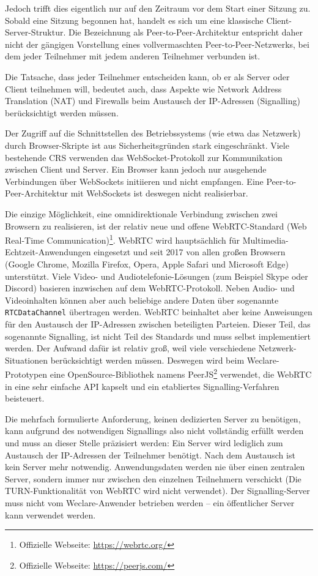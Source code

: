 Jedoch trifft dies eigentlich nur auf den Zeitraum vor dem Start einer Sitzung zu. Sobald eine Sitzung begonnen hat, handelt es sich um eine klassische Client-Server-Struktur. Die Bezeichnung als Peer-to-Peer-Architektur entspricht daher nicht der gängigen Vorstellung eines vollvermaschten Peer-to-Peer-Netzwerks, bei dem jeder Teilnehmer mit jedem anderen Teilnehmer verbunden ist.

Die Tatsache, dass jeder Teilnehmer entscheiden kann, ob er als Server oder Client teilnehmen will, bedeutet auch, dass Aspekte wie Network Address Translation (NAT) und Firewalls beim Austausch der IP-Adressen (Signalling) berücksichtigt werden müssen.

Der Zugriff auf die Schnittstellen des Betriebssystems (wie etwa das Netzwerk) durch Browser-Skripte ist aus Sicherheitsgründen stark eingeschränkt. Viele bestehende CRS verwenden das WebSocket-Protokoll zur Kommunikation zwischen Client und Server. Ein Browser kann jedoch nur ausgehende Verbindungen über WebSockets initiieren und nicht empfangen. Eine Peer-to-Peer-Architektur mit WebSockets ist deswegen nicht realisierbar.

Die einzige Möglichkeit, eine omnidirektionale Verbindung zwischen zwei Browsern zu realisieren, ist der relativ neue und offene WebRTC-Standard (Web Real-Time Communication)\footnote{Offizielle Webseite: \url{https://webrtc.org/}}. WebRTC wird hauptsächlich für Multimedia-Echtzeit-Anwendungen eingesetzt und seit 2017 von allen großen Browsern (Google Chrome, Mozilla Firefox, Opera, Apple Safari und Microsoft Edge) unterstützt. Viele Video- und Audiotelefonie-Lösungen (zum Beispiel Skype oder Discord) basieren inzwischen auf dem WebRTC-Protokoll. Neben Audio- und Videoinhalten können aber auch beliebige andere Daten über sogenannte \texttt{RTCDataChannel} übertragen werden. WebRTC beinhaltet aber keine Anweisungen für den Austausch der IP-Adressen zwischen beteiligten Parteien. Dieser Teil, das sogenannte Signalling, ist nicht Teil des Standards und muss selbst implementiert werden. Der Aufwand dafür ist relativ groß, weil viele verschiedene Netzwerk-Situationen berücksichtigt werden müssen. Deswegen wird beim Weclare-Prototypen eine OpenSource-Bibliothek namens PeerJS\footnote{Offizielle Webseite: \url{https://peerjs.com/}} verwendet, die WebRTC in eine sehr einfache API kapselt und ein etabliertes Signalling-Verfahren beisteuert.

Die mehrfach formulierte Anforderung, keinen dedizierten Server zu benötigen, kann aufgrund des notwendigen Signallings also nicht vollständig erfüllt werden und muss an dieser Stelle präzisiert werden: Ein Server wird lediglich zum Austausch der IP-Adressen der Teilnehmer benötigt. Nach dem Austausch ist kein Server mehr notwendig. Anwendungsdaten werden nie über einen zentralen Server, sondern immer nur zwischen den einzelnen Teilnehmern verschickt (Die TURN-Funktionalität von WebRTC wird nicht verwendet). Der Signalling-Server muss nicht vom Weclare-Anwender betrieben werden – ein öffentlicher Server kann verwendet werden.

